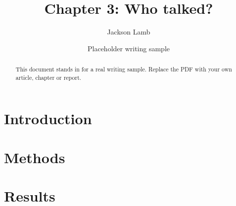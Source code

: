 \documentclass[11pt]{article}
\title{Chapter 3: Who talked?}
\author{Jackson Lamb}
\date{Placeholder writing sample}
\begin{document}
\maketitle
\begin{abstract}
This document stands in for a real writing sample. Replace the PDF with your own article, chapter or report.
\end{abstract}
\section{Introduction}
\lipsum[1-4]
\section{Methods}
\lipsum[5-9]
\section{Results}
\lipsum[10-14]
\end{document}
